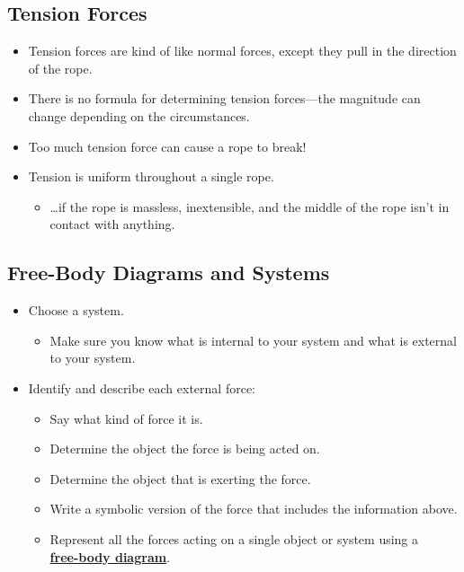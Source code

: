 \documentclass[]{article}
\begin{document}
\begin{PresentSpace}
\vspace{-10pt}
\section*{Tension Forces}
\vspace{-10pt}
\begin{itemize}
	\item Tension forces are kind of like normal forces, except they pull in the direction of
	the rope.
	\item There is no formula for determining tension forces---the magnitude can change depending on the circumstances.
	\item Too much tension force can cause a rope to break!
	\item Tension is uniform throughout a single rope.
	\begin{itemize}
		\normalsize
		\item \dots if the rope is massless, inextensible, and the middle of the rope isn’t in contact with anything.
	\end{itemize}
\end{itemize}
\end{PresentSpace}
\newpage
\begin{TeacherMargin}

\end{TeacherMargin}
\begin{PresentSpace}
\vspace{-10pt}
\section*{Free-Body Diagrams and Systems}
\vspace{-10pt}
\begin{itemize}
	\item Choose a system.
	\begin{itemize}
		\large
		\item Make sure you know what is internal to your system and what is external to your system.
	\end{itemize}
	\item Identify and describe each external force:
	\begin{itemize}
		\large
		\item Say what kind of force it is.
		\item Determine the object the force is being acted on.
		\item Determine the object that is exerting the force.
		\item Write a symbolic version of the force that includes the information above.
		\item Represent all the forces acting on a single object or system using a \\
		\textbf{\underline{free-body diagram}}.
	\end{itemize}
\end{itemize}
\end{PresentSpace}
\end{document}

